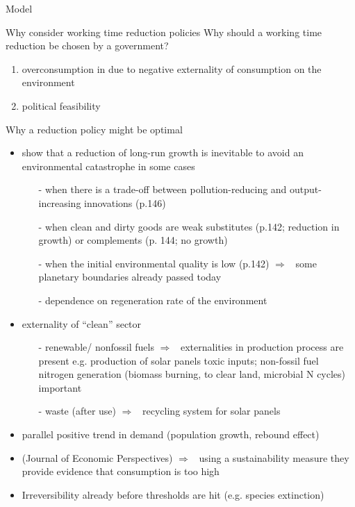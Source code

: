 \documentclass[11pt,aspectratio=169]{beamer}
\newcommand{\ar}{$\Rightarrow$ \ }
\begin{document}
\begin{frame}{Model}

\end{frame}

\begin{frame}{Why consider working time reduction policies}
	Why should a working time reduction be chosen by a government?
\begin{enumerate}
\item overconsumption in due to negative externality of consumption on the environment
\item political feasibility
\end{enumerate}
\end{frame}
\begin{frame}[allowframebreaks]{Why a reduction policy might be optimal}
\begin{itemize}
	\item \cite{Acemoglu2012TheChange} show that a reduction of long-run growth is inevitable to avoid an environmental catastrophe in some cases
	\begin{itemize}
\item[-] when there is a trade-off between pollution-reducing and output-increasing innovations (p.146)
\item[-] when clean and dirty goods are weak substitutes (p.142; reduction in growth)  or complements (p. 144; no growth)
\item[-] when the initial environmental quality is low (p.142) \ar some planetary boundaries already passed today \citep{Rockstrom2009AHumanity}
\item[-] dependence on regeneration rate of the environment
	\end{itemize}
\item externality of ``clean'' sector
\begin{itemize}
\item[-] renewable/ nonfossil fuels \ar externalities in production process are present e.g. production of solar panels toxic inputs; non-fossil fuel nitrogen generation (biomass burning, to clear land, microbial N cycles) important \citep{Song2021ImportantEmissions} 
\item[-] waste (after use) \ar recycling system for solar panels 
\end{itemize}
\item parallel positive trend in demand (population growth, rebound effect)
\item \cite{Arrow2004AreMuch}(Journal of Economic Perspectives) \ar using a sustainability measure they provide evidence that consumption is too high
\item Irreversibility already before thresholds are hit (e.g. species extinction)
\end{itemize}
\end{frame}
\end{document}

